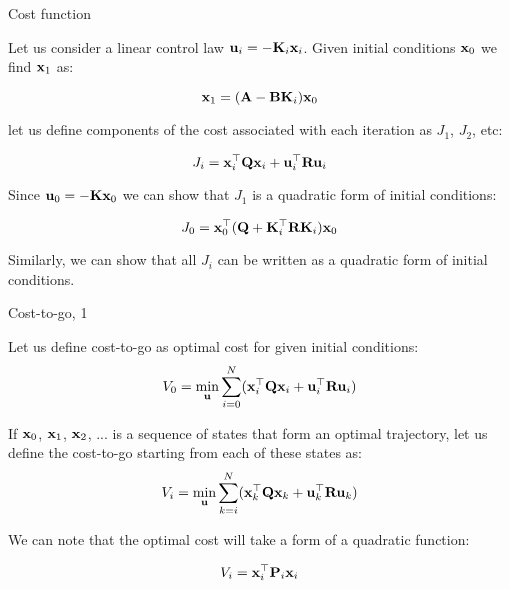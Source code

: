 \documentclass{beamer}
\begin{document}
\begin{frame}{Cost function}
	\begin{flushleft}
		
		Let us consider a linear control law $\mathbf{u}_i = - \mathbf{K}_i \mathbf{x}_i$. Given initial conditions $\mathbf{x}_0$ we find $\mathbf{x}_1$ as:
		
		\begin{equation}
			\mathbf{x}_1 =(\mathbf{A} -  \mathbf{B}\mathbf{K}_i )\mathbf{x}_0
		\end{equation}
		
		let us define components of the cost associated with each iteration as $J_1$, $J_2$, etc:
		
		\begin{equation}
			J_i = \mathbf{x}_i^\top \mathbf{Q} \mathbf{x}_i +  \mathbf{u}_i^\top \mathbf{R} \mathbf{u}_i
		\end{equation}
		
		Since $\mathbf{u}_0 = - \mathbf{K} \mathbf{x}_0$ we can show that $J_1$ is a quadratic form of initial conditions:
		
		\begin{equation}
			J_0 = \mathbf{x}_0^\top (\mathbf{Q}+   \mathbf{K}_i^\top \mathbf{R} \mathbf{K}_i) \mathbf{x}_0
		\end{equation}
		
		Similarly, we can show that all $J_i$ can be written as a quadratic form of initial conditions.
		
	\end{flushleft}
\end{frame}




\begin{frame}{Cost-to-go, 1}
	\begin{flushleft}
		
		Let us define cost-to-go as optimal cost for given initial conditions:
		\begin{equation}
			V_0 = \underset{\mathbf{u}}{\text{min}} \sum_{i=0}^N (\mathbf{x}_i^\top \mathbf{Q} \mathbf{x}_i +  \mathbf{u}_i^\top \mathbf{R} \mathbf{u}_i)
		\end{equation}
		
		If $\mathbf{x}_0$, $\mathbf{x}_1$, $\mathbf{x}_2$, ... is a sequence of states that form an optimal trajectory, let us define the cost-to-go starting from each of these states as:
		\begin{equation}
			V_i =  \underset{\mathbf{u}}{\text{min}} \sum_{k = i}^N (\mathbf{x}_k^\top \mathbf{Q} \mathbf{x}_k +  \mathbf{u}_k^\top \mathbf{R} \mathbf{u}_k)
		\end{equation}
		
		We can note that the optimal cost will take a form of a quadratic function:
		
		\begin{equation}
			V_i = \mathbf{x}_i^\top \mathbf{P}_i \mathbf{x}_i
		\end{equation}
		
		
		
	\end{flushleft}
\end{frame}
\end{document}
